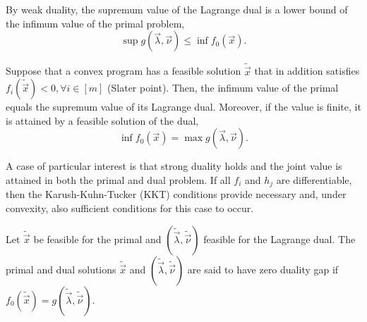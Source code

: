 \begin{corollary}
    By weak duality, the supremum value of the Lagrange dual is a lower bound of the infimum value of the primal problem, \[
        \sup g(\vec{\lambda}, \vec{\nu}) \leq \inf f_0(\vec{x}).
    \]
\end{corollary}

\begin{theorem}
    Suppose that a convex program has a feasible solution $\tilde{\vec{x}}$ that in addition satisfies
    $f_i(\tilde{\vec{x}}) < 0, \forall i \in [m]$ (Slater point). Then, the infimum value of the primal
    equals the supremum value of its Lagrange dual. Moreover, if the value is finite, it is attained
    by a feasible solution of the dual, \[
        \inf f_0(\vec{x}) = \max g(\vec{\lambda},\vec{\nu}).
    \]
\end{theorem}

A case of particular interest is that strong duality holds and the joint value is attained in both
the primal and dual problem. If all $f_i$ and $h_j$ are differentiable, then the
Karush-Kuhn-Tucker (KKT) conditions provide necessary and, under convexity, also sufficient
conditions for this case to occur.


\begin{definition}
    Let $\tilde{\vec{x}}$ be feasible for the primal and $(\tilde{\vec{\lambda}},\tilde{\vec{\nu}})$
    feasible for the Lagrange dual. The primal and dual solutions $\tilde{\vec{x}}$ and
    $(\tilde{\vec{\lambda}},\tilde{\vec{\nu}})$ are said to have zero duality gap if
    $f_0(\tilde{\vec{x}}) = g(\tilde{\vec{\lambda}}, \tilde{\vec{\nu}})$.
\end{definition}

